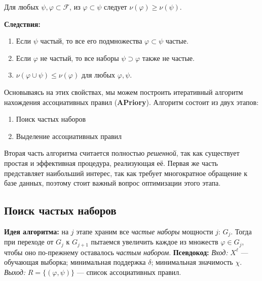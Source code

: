 Для любых \( \psi, \varphi \subset \mathcal{F} \), из \( \varphi \subset \psi \) следует \( \nu(\varphi) \geq \nu(\psi) \).

\textbf{Следствия:}

\begin{enumerate}
    \item Если \( \psi \) частый, то все его подмножества \( \varphi \subset \psi \) частые.
    \item Если \( \varphi \) не частый, то все наборы \( \psi \supset \varphi \) также не частые.
    \item \( \nu(\varphi \cup \psi) \leq \nu(\varphi) \) для любых \( \varphi, \psi \).
\end{enumerate}

Основываясь на этих свойствах, мы можем построить итеративный алгоритм нахождения ассоциативных правил (\textbf{APriory}). Алгоритм состоит из двух этапов:

\begin{enumerate}
    \item Поиск частых наборов 
    \item Выделение ассоциативных правил
\end{enumerate}

Вторая часть алгоритма считается полностью \textit{решенной}, так как существует простая и эффективная процедура, реализующая её. Первая же часть представляет наибольший интерес, так как требует многократное обращение к базе данных, поэтому стоит важный вопрос оптимизации этого этапа.

\subsection{Поиск частых наборов}

\textbf{Идея алгоритма:} на \( j\) этапе храним все \textit{частые наборы} мощности \(j\): \(G_j\). Тогда при переходе от \(G_j\) к \(G_{j+1}\) пытаемся увеличить каждое из множеств \(\varphi \in G_j\), чтобы оно по-прежнему оставалось \textit{частым набором}.
\newline\newline
\textbf{Псевдокод:}
\newline
\textit{Вход:} \( X^\ell \) — обучающая выборка; минимальная поддержка \( \delta \); минимальная значимость \( \chi \).
\newline
\textit{Выход:} \( R = \{(\varphi, \psi)\} \) — список ассоциативных правил.

